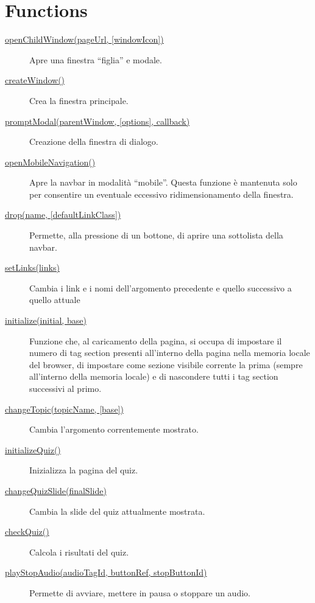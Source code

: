 \hypertarget{functions}{%
\section{Functions}\label{functions}}

\begin{description}
\item[{ \protect\hyperlink{openChildWindow}{openChildWindow(pageUrl,
{[}windowIcon{]})} }]
Apre una finestra ``figlia'' e modale.
\item[{ \protect\hyperlink{createWindow}{createWindow()} }]
Crea la finestra principale.
\item[{ \protect\hyperlink{promptModal}{promptModal(parentWindow,
{[}options{]}, callback)} }]
Creazione della finestra di dialogo.
\item[{ \protect\hyperlink{openMobileNavigation}{openMobileNavigation()}
}]
Apre la navbar in modalità ``mobile''. Questa funzione è mantenuta solo
per consentire un eventuale eccessivo ridimensionamento della finestra.
\item[{ \protect\hyperlink{drop}{drop(name, {[}defaultLinkClass{]})} }]
Permette, alla pressione di un bottone, di aprire una sottolista della
navbar.
\item[{ \protect\hyperlink{setLinks}{setLinks(links)} }]
Cambia i link e i nomi dell'argomento precedente e quello successivo a
quello attuale
\item[{ \protect\hyperlink{initialize}{initialize(initial, base)} }]
Funzione che, al caricamento della pagina, si occupa di impostare il
numero di tag section presenti all'interno della pagina nella memoria
locale del browser, di impostare come sezione visibile corrente la prima
(sempre all'interno della memoria locale) e di nascondere tutti i tag
section successivi al primo.
\item[{ \protect\hyperlink{changeTopic}{changeTopic(topicName,
{[}base{]})} }]
Cambia l'argomento correntemente mostrato.
\item[{ \protect\hyperlink{initializeQuiz}{initializeQuiz()} }]
Inizializza la pagina del quiz.
\item[{ \protect\hyperlink{changeQuizSlide}{changeQuizSlide(finalSlide)}
}]
Cambia la slide del quiz attualmente mostrata.
\item[{ \protect\hyperlink{checkQuiz}{checkQuiz()} }]
Calcola i risultati del quiz.
\item[{ \protect\hyperlink{playStopAudio}{playStopAudio(audioTagId,
buttonRef, stopButtonId)} }]
Permette di avviare, mettere in pausa o stoppare un audio.

\end{description}
